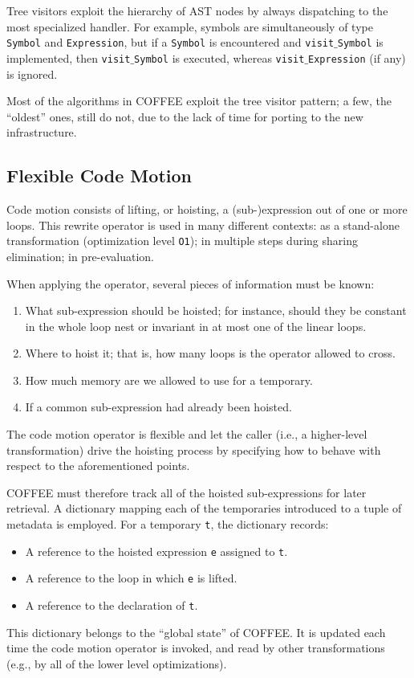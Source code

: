 Tree visitors exploit the hierarchy of AST nodes by always dispatching to the most specialized handler. For example, symbols are simultaneously of type \texttt{Symbol} and \texttt{Expression}, but if a \texttt{Symbol} is encountered and \texttt{visit$\_$Symbol} is implemented, then \texttt{visit$\_$Symbol} is executed, whereas \texttt{visit$\_$Expression} (if any) is ignored.

Most of the algorithms in COFFEE exploit the tree visitor pattern; a few, the ``oldest'' ones, still do not, due to the lack of time for porting to the new infrastructure.

\subsection{Flexible Code Motion}
Code motion consists of lifting, or hoisting, a (sub-)expression out of one or more loops. This rewrite operator is used in many different contexts: as a stand-alone transformation (optimization level \texttt{O1}); in multiple steps during sharing elimination; in pre-evaluation. 

When applying the operator, several pieces of information must be known:
\begin{enumerate}
\item What sub-expression should be hoisted; for instance, should they be constant in the whole loop nest or invariant in at most one of the linear loops.
\item Where to hoist it; that is, how many loops is the operator allowed to cross.
\item How much memory are we allowed to use for a temporary.
\item If a common sub-expression had already been hoisted.
\end{enumerate}
The code motion operator is flexible and let the caller (i.e., a higher-level transformation) drive the hoisting process by specifying how to behave with respect to the aforementioned points.

COFFEE must therefore track all of the hoisted sub-expressions for later retrieval. A dictionary mapping each of the temporaries introduced to a tuple of metadata is employed. For a temporary \texttt{t}, the dictionary records:
\begin{itemize}
\item A reference to the hoisted expression \texttt{e} assigned to \texttt{t}.
\item A reference to the loop in which \texttt{e} is lifted.
\item A reference to the declaration of \texttt{t}.
\end{itemize}
This dictionary belongs to the ``global state'' of COFFEE. It is updated each time the code motion operator is invoked, and read by other transformations (e.g., by all of the lower level optimizations).

